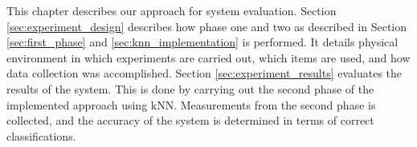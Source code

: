 This chapter describes our approach for system evaluation. 
Section \ref{sec:experiment_design} describes how phase one and two as described in Section \ref{sec:first_phase} and \ref{sec:knn_implementation} is performed.
It details physical environment in which experiments are carried out, which items are used, and how data collection was accomplished.
Section \ref{sec:experiment_results} evaluates the results of the system. 
This is done by carrying out the second phase of the implemented approach using kNN. 
Measurements from the second phase is collected, and the accuracy of the system is determined in terms of correct classifications. 